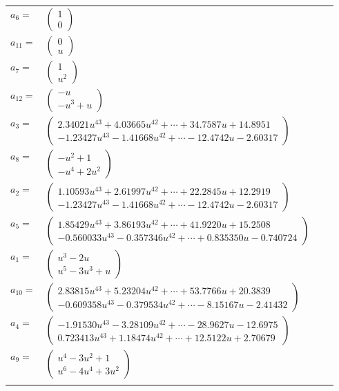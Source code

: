 \documentclass[1p]{elsarticle_modified}
\theoremstyle{definition}
\begin{document}
\begin{tabular}{m{7pt} m{180pt} m{7pt} m{180pt} }
\flushright $a_{6}=$&$\begin{pmatrix}1\\0\end{pmatrix}$ \\
\flushright $a_{11}=$&$\begin{pmatrix}0\\u\end{pmatrix}$ \\
\flushright $a_{7}=$&$\begin{pmatrix}1\\u^2\end{pmatrix}$ \\
\flushright $a_{12}=$&$\begin{pmatrix}- u\\- u^3+u\end{pmatrix}$ \\
\flushright $a_{3}=$&$\begin{pmatrix}2.34021 u^{43}+4.03665 u^{42}+\cdots+34.7587 u+14.8951\\-1.23427 u^{43}-1.41668 u^{42}+\cdots-12.4742 u-2.60317\end{pmatrix}$ \\
\flushright $a_{8}=$&$\begin{pmatrix}- u^2+1\\- u^4+2 u^2\end{pmatrix}$ \\
\flushright $a_{2}=$&$\begin{pmatrix}1.10593 u^{43}+2.61997 u^{42}+\cdots+22.2845 u+12.2919\\-1.23427 u^{43}-1.41668 u^{42}+\cdots-12.4742 u-2.60317\end{pmatrix}$ \\
\flushright $a_{5}=$&$\begin{pmatrix}1.85429 u^{43}+3.86193 u^{42}+\cdots+41.9220 u+15.2508\\-0.560033 u^{43}-0.357346 u^{42}+\cdots+0.835350 u-0.740724\end{pmatrix}$ \\
\flushright $a_{1}=$&$\begin{pmatrix}u^3-2 u\\u^5-3 u^3+u\end{pmatrix}$ \\
\flushright $a_{10}=$&$\begin{pmatrix}2.83815 u^{43}+5.23204 u^{42}+\cdots+53.7766 u+20.3839\\-0.609358 u^{43}-0.379534 u^{42}+\cdots-8.15167 u-2.41432\end{pmatrix}$ \\
\flushright $a_{4}=$&$\begin{pmatrix}-1.91530 u^{43}-3.28109 u^{42}+\cdots-28.9627 u-12.6975\\0.723413 u^{43}+1.18474 u^{42}+\cdots+12.5122 u+2.70679\end{pmatrix}$ \\
\flushright $a_{9}=$&$\begin{pmatrix}u^4-3 u^2+1\\u^6-4 u^4+3 u^2\end{pmatrix}$\\&\end{tabular}
\end{document}
